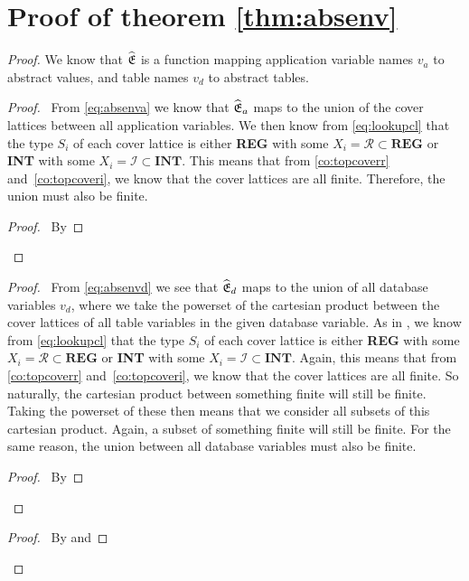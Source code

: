 \section{Proof of theorem \ref{thm:absenv}}

\absenv*

\begin{proof}
   We know that $\widehat{\mathfrak{E}}$ is a function mapping application variable names $v_a$ to abstract values, and table names $v_d$ to abstract tables.
    \begin{proof}
        \pf\ From \autoref{eq:absenva} we know that $\widehat{\mathfrak{E}}_a$ maps to the union of the cover lattices between all application variables.
        We then know from \autoref{eq:lookupcl} that the type $S_i$ of each cover lattice is either \textbf{REG} with some $X_i=\mathcal{R}\subset\textbf{REG}$ or \textbf{INT} with some $X_i=\mathcal{I}\subset\textbf{INT}$.
        This means that from \autoref{co:topcoverr} and~\ref{co:topcoveri}, we know that the cover lattices are all finite.
        Therefore, the union must also be finite.
        \qedstep
        \begin{proof}
            \pf\ By 
        \end{proof}
    \end{proof}
    \begin{proof}
        \pf\ From \autoref{eq:absenvd} we see that $\widehat{\mathfrak{E}}_d$ maps to the union of all database variables $v_d$, where we take the powerset of the cartesian product between the cover lattices of all table variables in the given database variable.
        As in , we know from \autoref{eq:lookupcl} that the type $S_i$ of each cover lattice is either \textbf{REG} with some $X_i=\mathcal{R}\subset\textbf{REG}$ or \textbf{INT} with some $X_i=\mathcal{I}\subset\textbf{INT}$.
        Again, this means that from \autoref{co:topcoverr} and~\ref{co:topcoveri}, we know that the cover lattices are all finite.
        So naturally, the cartesian product between something finite will still be finite.
        Taking the powerset of these then means that we consider all subsets of this cartesian product.
        Again, a subset of something finite will still be finite.
        For the same reason, the union between all database variables must also be finite.
        \qedstep
        \begin{proof}
            \pf\ By 
        \end{proof}
    \end{proof}
    \qedstep
    \begin{proof}
        \pf\ By  and 
    \end{proof}
\end{proof}
